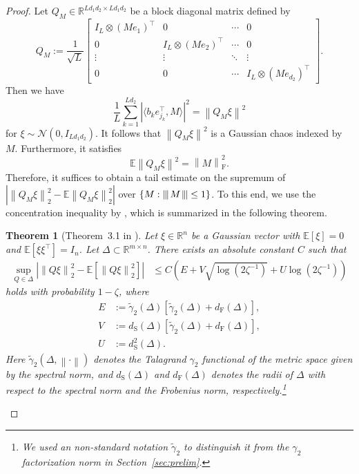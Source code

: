 \documentclass[11pt]{article}
\newtheorem{theorem}[lemma]{Theorem}
\newcommand{\xspace}{\hbox{\kern-2.5pt}}
\newcommand\tnorm[1]{\left\vert\xspace\left\vert\xspace\left\vert\mskip2mu
#1\mskip2mu \right\vert\xspace\right\vert\xspace\right\vert}
\newcommand{\norm}[1]{\left \|#1 \right \|}
\newcommand{\E}{\mathbb{E}}
\begin{document}
\begin{proof}
Let $Q_M \in \mathbb{R}^{Ld_1d_2 \times Ld_1d_2}$ be a block diagonal matrix defined by
\begin{equation*}
Q_{M} := \frac{1}{\sqrt{L}}
\begin{bmatrix}
I_L \otimes (M e_1)^{\top} & 0 & \cdots & 0 \\
0 & I_L \otimes (M e_2)^{\top} & \cdots & 0 \\
 \vdots & \vdots & \ddots & \vdots \\
0 & 0 & \cdots & I_L \otimes (M e_{d_2})^{\top}
\end{bmatrix}. 
\end{equation*} 
Then we have
\begin{equation*}
\frac{1}{L} \sum_{k=1}^{Ld_2} |\langle b_k e_{j_k}^\top, M \rangle |^2  = \norm{Q_M \xi}^2
\end{equation*} 
for $\xi \sim \mathcal{N}(0,I_{Ld_1d_2})$.
It follows that $\norm{Q_M \xi}^2$ is a Gaussian chaos indexed by $M$. 
Furthermore, it satisfies
\begin{equation*}
     \mathbb{E} \norm{Q_M \xi}^2 = \norm{M}_\mathrm{F}^2.
\end{equation*}
Therefore, it suffices to obtain a tail estimate on the supremum of $|\norm{Q_M \xi}_2^2 - \mathbb{E} \norm{Q_M \xi}_2^2|$ over $\{M: \tnorm{M} \leq 1\}$. 
To this end, we use the concentration inequality by \citet{krahmer2014suprema}, which is summarized in the following theorem.

\begin{theorem}[{Theorem~3.1 in \citep{krahmer2014suprema}}]
\label{thm:kmr}
Let $\xi \in \mathbb{R}^n$ be a Gaussian vector with $\mathbb{E}[\xi] = 0$ and $\mathbb{E}[\xi \xi^\top] = I_n$. 
Let $\Delta \subset \mathbb{R}^{m \times n}$. 
There exists an absolute constant $C$ such that
\begin{align*}
 \sup_{Q \in \Delta} \left|\norm{Q \xi}_2^2 - \E[\norm{Q \xi}_2^2] \right| 
& \leq C\left( E + V \sqrt{\log(2\zeta^{-1})} + U \log(2\zeta^{-1}) \right)
\end{align*}
holds with probability $1-\zeta$, where
\begin{align*}
E {} & := \tilde{\gamma}_2(\Delta)
\left[ \tilde{\gamma}_2(\Delta) + d_{\mathrm{F}}(\Delta) \right], \\
V {} & := d_{\mathrm{S}}(\Delta) \left[ \tilde{\gamma}_2(\Delta) + d_{\mathrm{F}}(\Delta) \right], \\
U {} & := d_{\mathrm{S}}^2(\Delta).
\end{align*}
Here $\tilde{\gamma}_2(\Delta,\norm{\cdot})$ denotes the Talagrand $\gamma_2$ functional of the metric space given by the spectral norm, and $d_\mathrm{S}(\Delta)$ and $d_\mathrm{F}(\Delta)$ denotes the radii of $\Delta$ with respect to the spectral norm and the Frobenius norm, respectively.\footnote{We used an non-standard notation $\tilde{\gamma}_2$ to distinguish it from the $\gamma_2$ factorization norm in Section~\ref{sec:prelim}.}
\end{theorem}


\end{proof}
\end{document}
